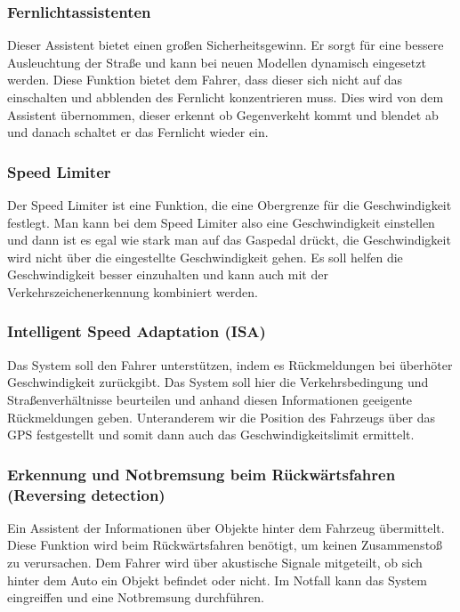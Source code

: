         \subsubsection{Fernlichtassistenten}
        Dieser Assistent bietet einen großen Sicherheitsgewinn. Er sorgt für eine bessere
        Ausleuchtung der Straße und kann bei neuen Modellen dynamisch eingesetzt werden.
        Diese Funktion bietet dem Fahrer, dass dieser sich nicht auf das einschalten und
        abblenden des Fernlicht konzentrieren muss. Dies wird von dem Assistent übernommen,
        dieser erkennt ob Gegenverkeht kommt und blendet ab und danach schaltet er das Fernlicht
        wieder ein.

        \subsubsection{Speed Limiter}
        Der Speed Limiter ist eine Funktion, die eine Obergrenze für die Geschwindigkeit festlegt.
        Man kann bei dem Speed Limiter also eine Geschwindigkeit einstellen 
        und dann ist es egal wie stark man auf das Gaspedal drückt, die Geschwindigkeit wird nicht 
        über die eingestellte Geschwindigkeit gehen. Es soll helfen die Geschwindigkeit besser 
        einzuhalten und kann auch mit der Verkehrszeichenerkennung kombiniert werden.
        
        \subsubsection{Intelligent Speed Adaptation (ISA)}
        Das System soll den Fahrer unterstützen, indem es Rückmeldungen bei überhöter Geschwindigkeit
        zurückgibt. Das System soll hier die Verkehrsbedingung und Straßenverhältnisse beurteilen und
        anhand diesen Informationen geeigente Rückmeldungen geben. Unteranderem wir die Position des 
        Fahrzeugs über das GPS festgestellt und somit dann auch das Geschwindigkeitslimit ermittelt.
        
        \subsubsection{Erkennung und Notbremsung beim Rückwärtsfahren (Reversing detection)}
        Ein Assistent der Informationen über Objekte hinter dem Fahrzeug übermittelt. Diese Funktion
        wird beim Rückwärtsfahren benötigt, um keinen Zusammenstoß zu verursachen. Dem Fahrer wird 
        über akustische Signale mitgeteilt, ob sich hinter dem Auto ein Objekt befindet oder nicht.
        Im Notfall kann das System eingreiffen und eine Notbremsung durchführen.

